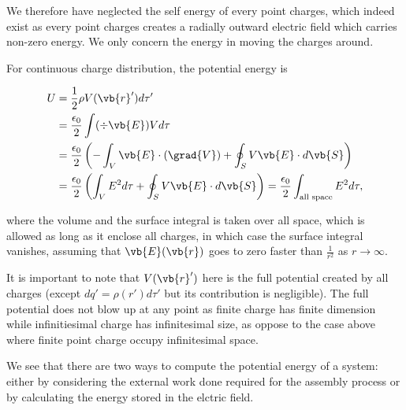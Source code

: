 \documentclass[english,a4paper,12pt]{report}
\begin{document}
We therefore have neglected the self energy of every point charges, which indeed exist as every point charges creates a radially outward electric field which carries non-zero energy. We only concern the energy in moving the charges around.

For continuous charge distribution, the potential energy is 

\begin{equation}
    \begin{aligned} 
    U &= \frac{1}{2} \rho V(\vb{r} ') d\tau' \\
    &= \frac{\epsilon _{0} }{2}\int (\div{\vb{E} })Vd\tau  \\
    &= \frac{\epsilon _{0} }{2}\left( -\int_{V}^{} \vb{E} \cdot (\grad{V} ) + \oint_{S} V\vb{E} \cdot d\vb{S}   \right) \\
    &= \frac{\epsilon _{0} }{2}\left( \int_{V}^{} E^2d\tau + \oint_{S} V\vb{E} \cdot d\vb{S} \right) = \frac{\epsilon _{0} }{2} \int_{\text{all space}}^{} E^2d\tau ,
    \end{aligned}    
\end{equation}

where the volume and the surface integral is taken over all space, which is allowed as long as it enclose all charges, in which case the surface integral vanishes, assuming that \(\vb{E} (\vb{r} )\) goes to zero faster than \(\displaystyle \frac{1}{r^2} \) as \(r \to \infty\).   

It is important to note that \(V(\vb{r} ')\) here is the full potential created by all charges (except \(dq' = \rho (r') d\tau '\) but its contribution is negligible). The full potential does not blow up at any point as finite charge has finite dimension while infinitiesimal charge has infinitesimal size, as oppose to the case above where finite point charge occupy infinitesimal space. 

We see that there are two ways to compute the potential energy of a system: either by considering the external work done required for the assembly process or by calculating the energy stored in the elctric field.
\end{document}
